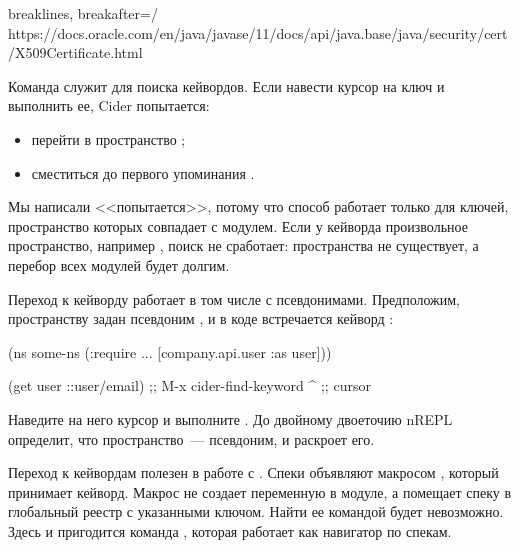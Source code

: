 \begin{english}
  \begin{text*}{breaklines, breakafter=/}
https://docs.oracle.com/en/java/javase/11/docs/api/java.base/java/security/cert/X509Certificate.html
  \end{text*}
\end{english}

Команда  служит для поиска кейвордов. Если навести курсор на ключ  и выполнить ее, Cider попытается:

\begin{itemize}

\item
  перейти в пространство ;

\item
  сместиться до первого упоминания .

\end{itemize}

Мы написали <<попытается>>, потому что способ работает только для ключей, пространство которых совпадает с модулем. Если у кейворда произвольное пространство, например , поиск не сработает: пространства  не существует, а перебор всех модулей будет долгим.

Переход к кейворду работает в том числе с псевдонимами. Предположим, пространству  задан псевдоним , и в коде встречается кейворд :

\begin{english}
  \begin{clojure}
(ns some-ns
  (:require
   ...
   [company.api.user :as user]))

(get user ::user/email) ;; M-x cider-find-keyword
                ^       ;; cursor
  \end{clojure}
\end{english}

Наведите на него курсор и выполните . До двойному двоеточию nREPL определит, что пространство~--- псевдоним, и раскроет его.

Переход к кейвордам полезен в работе с . Спеки объявляют макросом , который принимает кейворд. Макрос не создает переменную в модуле, а помещает спеку в глобальный реестр с указанными ключом. Найти ее командой  будет невозможно. Здесь и пригодится команда , которая работает как навигатор по спекам.

